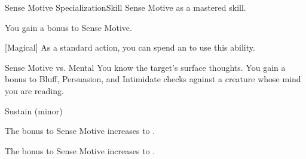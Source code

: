     \begin{feat}{Sense Motive Specialization}{Skill}
        \featpre Sense Motive as a mastered skill.
        \featben

         You gain a  bonus to Sense Motive.

        [Magical] As a standard action, you can spend an  to use this ability.
        \begin{ability}
            \begin{spelltargetinginfo}
            \end{spelltargetinginfo}
            \begin{spelleffects}
                \begin{spellattack}{Sense Motive vs. Mental}
                    \spellsuccess You know the target's surface thoughts.
                    You gain a  bonus to Bluff, Persuasion, and Intimidate checks against a creature whose mind you are reading.
                \end{spellattack}
                \spelldur Sustain (minor)
            \end{spelleffects}
        \end{ability}

         The bonus to Sense Motive increases to .

         The bonus to Sense Motive increases to .
    \end{feat}

